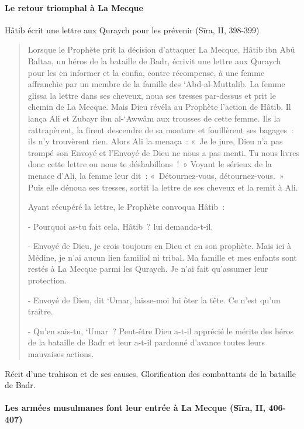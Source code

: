 \paragraph{Le retour triomphal à La
Mecque}

Hâtib écrit une lettre aux Quraych pour les prévenir (Sīra, II, 398-399)
\begin{quote}

{Lorsque le Prophète prit la décision d'attaquer La Mecque, Hâtib
ibn Abû Baltaa, un héros de la bataille de Badr, écrivit une
lettre aux Quraych pour les en informer et la confia, contre récompense,
à une femme affranchie par un membre de la famille des `Abd-al-Muttalib.
La femme glissa la lettre dans ses cheveux, noua ses tresses par-dessus
et prit le chemin de La Mecque. Mais Dieu révéla au Prophète l'action de
Hâtib. Il lança Ali et Zubayr ibn al-`Awwâm aux trousses de cette femme.
Ils la rattrapèrent, la firent descendre de sa monture et fouillèrent
ses bagages~: ils n'y trouvèrent rien. Alors Ali la menaça~: «~Je le
jure, Dieu n'a pas trompé son Envoyé et l'Envoyé de Dieu ne nous a pas
menti. Tu nous livres donc cette lettre ou nous te déshabillons~!~»
Voyant le sérieux de la menace d'Ali, la femme leur dit~:
«~Détournez-vous, détournez-vous.~» Puis elle dénoua ses tresses, sortit
la lettre de ses cheveux et la remit à Ali.}

{Ayant récupéré la lettre, le Prophète convoqua Hâtib~:}

{- Pourquoi as-tu fait cela, Hâtib~? lui demanda-t-il.}

{- Envoyé de Dieu, je crois toujours en Dieu et en son prophète.
Mais ici à Médine, je n'ai aucun lien familial ni tribal. Ma famille et
mes enfants sont restés à La Mecque parmi les Quraych. Je n'ai fait
qu'assumer leur protection.}

{- Envoyé de Dieu, dit `Umar, laisse-moi lui ôter la tête. Ce n'est
qu'un traître.}

{- Qu'en sais-tu, `Umar~? Peut-être Dieu a-t-il apprécié le mérite
des héros de la bataille de Badr et leur a-t-il pardonné d'avance toutes
leurs mauvaises actions.}
    
\end{quote}
Récit d'une trahison et de ses causes. Glorification des combattants de
la bataille de Badr.

\paragraph{Les armées musulmanes font leur entrée à La Mecque (Sīra, II, 406-407)}

